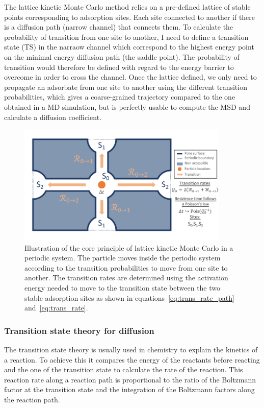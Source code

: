 \documentclass[main]{subfiles}
\begin{document}
The lattice kinetic Monte Carlo method relies on a pre-defined lattice of stable points corresponding to adsorption sites. Each site connected to another if there is a diffusion path (narrow channel) that connects them. To calculate the probability of transition from one site to another, I need to define a transition state (TS) in the narraow channel which correspond to the highest energy point on the minimal energy diffusion path (the saddle point). The probability of transition would therefore be defined with regard to the energy barrier to overcome in order to cross the channel. Once the lattice defined, we only need to propagate an adsorbate from one site to another using the different transition probabilities, which gives a coarse-grained trajectory compared to the one obtained in a MD simulation, but is perfectly usable to compute the MSD and calculate a diffusion coefficient.


\begin{figure}[ht]
  \centering
    \includegraphics[width=0.9\textwidth]{figures/5-diffusion/kinetic_MC.pdf}
    \caption{Illustration of the core principle of lattice kinetic Monte Carlo in a periodic system. The particle moves inside the periodic system according to the transition probabilities to move from one site to another. The transition rates are determined using the activation energy needed to move to the transition state between the two stable adsorption sites as shown in equations~\ref{eq:trans_rate_path} and~\ref{eq:trans_rate}. }\label{fgr:kMC_principle}
\end{figure}

\subsubsection{Transition state theory for diffusion}

The transition state theory is usually used in chemistry to explain the kinetics of a reaction. To achieve this it compares the energy of the reactants before reacting and the one of the transition state to calculate the rate of the reaction. This reaction rate along a reaction path is proportional to the ratio of the Boltzmann factor at the transition state and the integration of the Boltzmann factors along the reaction path.
\end{document}

